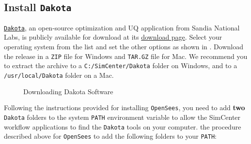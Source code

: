 \subsection{Install \texttt{Dakota}}

\href{http://dakota.sandia.gov}{\texttt{Dakota}}, an open-source  optimization and UQ application from Sandia National Labs, is publicly available for download at its \href{http://dakota.sandia.gov/download.html}{download page}. Select your operating system from the list and set the other options as shown in  . Download the release in a \texttt{ZIP} file for Windows and \texttt{TAR.GZ} file for Mac. We recommend you to extract the archive to a \texttt{C:/SimCenter/Dakota} folder on Windows, and to a \texttt{/usr/local/Dakota} folder on a Mac.

\begin{figure}[!htbp]
  \caption{Downloading Dakota Software}
  \label{fig:dakota_installation}
\end{figure}


Following the instructions provided for installing \texttt{OpenSees}, you need to add \textbf{two} \texttt{Dakota} folders to the system \texttt{PATH} environment variable to allow the SimCenter workflow applications to find the \texttt{Dakota} tools on your computer. 
the procedure described above for \texttt{OpenSees} to add the following
folders to your \texttt{PATH}:

